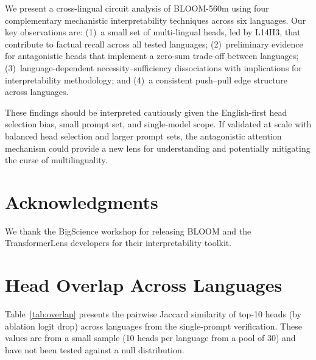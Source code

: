 \documentclass[11pt]{article}
\begin{document}
We present a cross-lingual circuit analysis of BLOOM-560m using four complementary mechanistic interpretability techniques across six languages.
Our key observations are: (1)~a small set of multi-lingual heads, led by L14H3, that contribute to factual recall across all tested languages; (2)~preliminary evidence for antagonistic heads that implement a zero-sum trade-off between languages; (3)~language-dependent necessity--sufficiency dissociations with implications for interpretability methodology; and (4)~a consistent push--pull edge structure across languages.

These findings should be interpreted cautiously given the English-first head selection bias, small prompt set, and single-model scope.
If validated at scale with balanced head selection and larger prompt sets, the antagonistic attention mechanism could provide a new lens for understanding and potentially mitigating the curse of multilinguality.

\section*{Acknowledgments}
We thank the BigScience workshop for releasing BLOOM and the TransformerLens developers for their interpretability toolkit.



\appendix

\section{Head Overlap Across Languages}
\label{app:overlap}

Table~\ref{tab:overlap} presents the pairwise Jaccard similarity of top-10 heads (by ablation logit drop) across languages from the single-prompt verification.
These values are from a small sample (10 heads per language from a pool of 30) and have not been tested against a null distribution.
\end{document}
